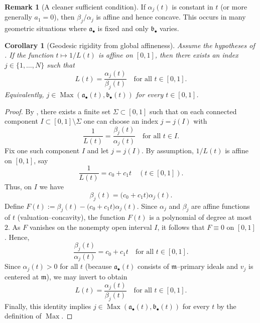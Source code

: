 \documentclass[12pt]{amsart}
\newcommand{\m}{\mathfrak m}
\renewcommand{\a}{\mathfrak{a}}
\renewcommand{\b}{\mathfrak{b}}
\DeclareMathOperator{\Max}{Max}
\newcommand{\abul}{{\a_\bullet}}
\newcommand{\bbul}{{\b_\bullet}}
\theoremstyle{plain}
\newtheorem{corollary}[theorem]{Corollary}
\theoremstyle{definition}
\newtheorem{remark}[theorem]{Remark}
\numberwithin{equation}{section}
\begin{document}
\begin{remark}[A cleaner sufficient condition]
	If $\alpha_j(t)$ is constant in $t$ (or more generally $a_1=0$), then $\beta_j/\alpha_j$ is affine
	and hence concave. This occurs in many geometric situations where $\abul$ is fixed and only
	$\bbul$ varies.
\end{remark}

\begin{corollary}[Geodesic rigidity from global affineness]\label{cor:geodesic-rigidity}
	Assume the hypotheses of . 
	If the function $t\mapsto 1/L(t)$ is affine on $[0,1]$, then there exists an index $j\in\{1,\dots,N\}$ such that
	\[
	L(t)=\frac{\alpha_j(t)}{\beta_j(t)}\quad\text{for all }t\in[0,1].
	\]
	Equivalently, $j\in\Max(\abul(t),\bbul(t))$ for every $t\in[0,1]$.
\end{corollary}

\begin{proof}
	By , there exists a finite set $\Sigma\subset[0,1]$ such that on each connected component
	$I\subset[0,1]\setminus\Sigma$ one can choose an index $j=j(I)$ with
	\[
	\frac{1}{L(t)}=\frac{\beta_j(t)}{\alpha_j(t)}\quad\text{for all }t\in I.
	\]
	Fix one such component $I$ and let $j=j(I)$. By assumption, $1/L(t)$ is affine on $[0,1]$, say
	\[
	\frac{1}{L(t)}=c_0+c_1 t\quad (t\in[0,1]).
	\]
	Thus, on $I$ we have
	\[
	\beta_j(t)=\bigl(c_0+c_1 t\bigr)\alpha_j(t).
	\]
	Define $F(t):=\beta_j(t)-\bigl(c_0+c_1 t\bigr)\alpha_j(t).$
	Since $\alpha_j$ and $\beta_j$ are affine functions of $t$ (valuation--concavity), the function $F(t)$ is a polynomial
	of degree at most $2$. As $F$ vanishes on the nonempty open interval $I$, it follows that $F\equiv 0$ on $[0,1]$.
	Hence,
	\[
	\frac{\beta_j(t)}{\alpha_j(t)}=c_0+c_1 t\quad\text{for all }t\in[0,1].
	\]
	Since $\alpha_j(t)>0$ for all $t$ (because $\abul(t)$ consists of $\m$--primary ideals and $v_j$ is centered at $\m$),
	we may invert to obtain
	\[
	L(t)=\frac{\alpha_j(t)}{\beta_j(t)}\quad\text{for all }t\in[0,1].
	\]
	Finally, this identity implies $j\in\Max(\abul(t),\bbul(t))$ for every $t$ by the definition of $\Max$.
\end{proof}




\end{document}
